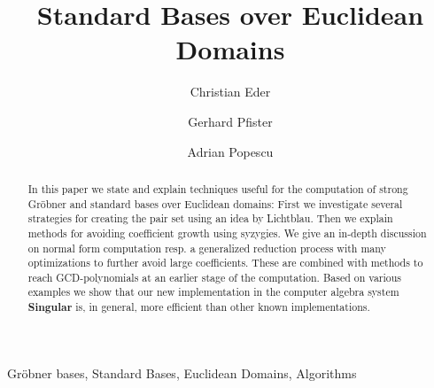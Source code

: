 \documentclass[final,1p,times,authoryear]{elsarticle}
\newcommand{\singular}{\textbf{Singular}\xspace}
\newcommand{\gpts}{GCD-poly\-no\-mials\xspace}
\begin{document}
\begin{frontmatter}

\title{Standard Bases over Euclidean Domains}

\author{Christian Eder}
\address{TU Kaiserslautern\\Department of Mathematics\\D-67663 Kaiserslautern}

\author{Gerhard Pfister}
\address{TU Kaiserslautern\\Department of Mathematics\\D-67663 Kaiserslautern}

\author{Adrian Popescu}
\address{TU Kaiserslautern\\Department of Mathematics\\D-67663 Kaiserslautern}

\begin{abstract}
In this paper we state and explain techniques useful for the computation of
strong Gr\"obner and standard bases over Euclidean domains: First we investigate
several strategies for creating the pair set using an idea by Lichtblau.
Then we explain methods for avoiding coefficient growth using syzygies.
We give an in-depth discussion on normal form computation resp. a generalized reduction
process with many optimizations to further avoid large coefficients. These are
combined with methods to reach \gpts at an earlier stage of the computation.
Based on various examples we show that our new implementation in the
computer algebra system \singular is, in general, more efficient than other
known implementations.
\end{abstract}

\begin{keyword}
Gr\"obner bases, Standard Bases, Euclidean Domains, Algorithms
\end{keyword}
\end{frontmatter}

%
\end{document}
